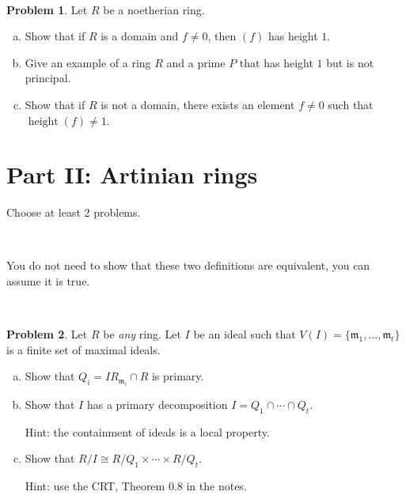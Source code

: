 \documentclass[11pt]{article}
\DeclareMathOperator{\height}{height}
\newcommand{\m}{\mathfrak{m}}
\theoremstyle{definition}
\newtheorem{problem}{Problem}
\begin{document}
\

\begin{problem}
	Let $R$ be a noetherian ring.
	\begin{enumerate}[a)]
		\item Show that if $R$ is a domain and $f \neq 0$, then $(f)$ has height $1$.
		\item Give an example of a ring $R$ and a prime $P$ that has height $1$ but is not principal.
		\item Show that if $R$ is not a domain, there exists an element $f \neq 0$ such that $\height(f) \neq 1$.
	\end{enumerate}
\end{problem}


\newpage


\section*{Part II: Artinian rings}

Choose at least 2 problems.


\vspace{2em}

\noindent
{} 

\

You do not need to show that these two definitions are equivalent, you can assume it is true.

\

\begin{problem}
	Let $R$ be \emph{any} ring. Let $I$ be an ideal such that $V(I) = \{ \m_1,\ldots,\m_t \}$ is a finite set of maximal ideals. 
	\begin{enumerate}[a)]
		\item Show that $Q_i = I R_{\m_i} \cap R$ is primary.
		\item Show that $I$ has a primary decomposition $I=Q_1 \cap \cdots \cap Q_t$.
		
		Hint: the containment of ideals is a local property.
		
		\item Show that $R/I \cong R/Q_1 \times \cdots \times R/Q_t$.
		
		Hint: use the CRT, Theorem 0.8 in the notes.
	\end{enumerate}
\end{problem}
\end{document}

